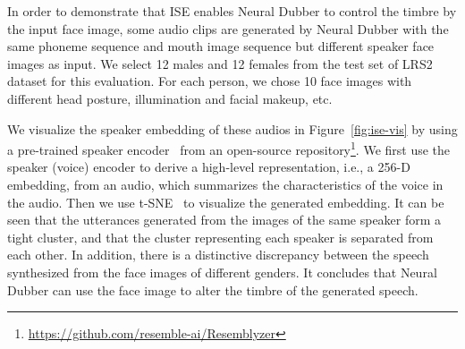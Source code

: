 \documentclass{article}
\begin{document}
In order to demonstrate that ISE enables Neural Dubber to control the timbre by the input face image, 
some audio clips are generated by Neural Dubber with the same phoneme sequence and mouth image sequence but different speaker face images as input.
We select 12 males and 12 females from the test set of LRS2 dataset for this evaluation. For each person, we chose 10 face images with different head posture, illumination and facial makeup, etc.

We visualize the speaker embedding of these audios in Figure~\ref{fig:ise-vis} by using a pre-trained speaker encoder~\cite{wan2018generalized} from an open-source repository\footnote{\url{https://github.com/resemble-ai/Resemblyzer}}. We first use the speaker (voice) encoder to derive a high-level representation, i.e., a 256-D embedding, from an audio, which summarizes the characteristics of the voice in the audio. Then we use t-SNE~\cite{van2008visualizing} to visualize the generated embedding. It can be seen that the utterances generated from the images of the same speaker form a tight cluster, and that the cluster representing each speaker is separated from each other. In addition, there is a distinctive discrepancy between the speech synthesized from the face images of different genders. It concludes that Neural Dubber can use the face image to alter the timbre of the generated speech.
\end{document}
